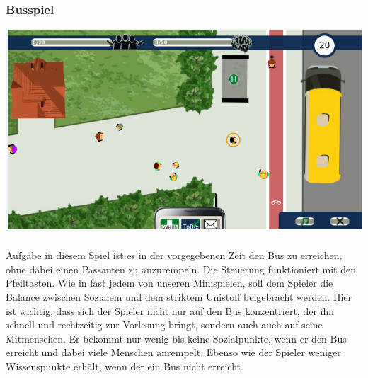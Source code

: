 \documentclass[a4paper, 11pt]{article} %
\begin{document}
\subsubsection{Busspiel}
\includegraphics[scale=0.535]{images/spiel/3.png}\\\\
Aufgabe in diesem Spiel ist es in der vorgegebenen Zeit den Bus zu erreichen, ohne dabei einen Passanten zu anzurempeln. Die Steuerung funktioniert mit den Pfeiltasten. Wie in fast jedem von unseren Minispielen, soll dem Spieler die Balance zwischen Sozialem und dem striktem Unistoff beigebracht werden. Hier ist wichtig, dass sich der Spieler nicht nur auf den Bus konzentriert, der ihn schnell und rechtzeitig zur Vorlesung bringt, sondern auch auch auf seine Mitmenschen. Er bekommt nur wenig bis keine Sozialpunkte, wenn er den Bus erreicht und dabei viele Menschen anrempelt. Ebenso wie der Spieler weniger Wissenspunkte erhält, wenn der ein Bus nicht erreicht.
\end{document}
